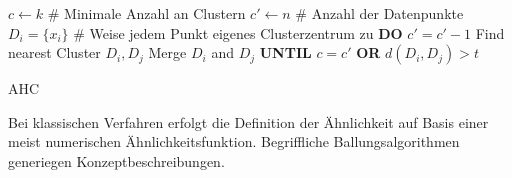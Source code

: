 \begin{algorithm}
    \begin{algorithmic}
        \State $c \leftarrow k$ \# Minimale Anzahl an Clustern
        \State $c' \leftarrow n$ \# Anzahl der Datenpunkte
        \State $D_i = \{x_i\}$ \# Weise jedem Punkt eigenes Clusterzentrum zu
        \State \textbf{DO}
        \IndState $c' = c' -1$
        \IndState Find nearest Cluster $D_i, D_j$
        \IndState Merge $D_i$ and $D_j$
        \State \textbf{UNTIL} $c = c'$ \textbf{OR} $d(D_i,D_j) > t$

        \caption{AHC}
    \end{algorithmic}

\end{algorithm}

Bei klassischen Verfahren erfolgt die Definition der Ähnlichkeit auf Basis
einer meist numerischen Ähnlichkeitsfunktion. Begriffliche Ballungsalgorithmen
generiegen Konzeptbeschreibungen.


